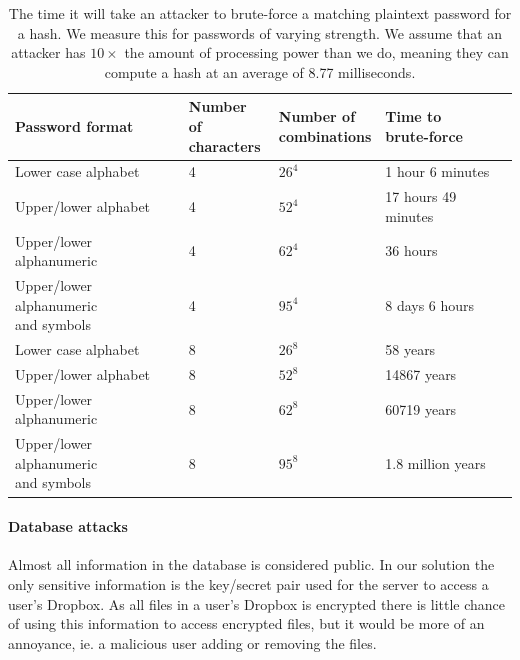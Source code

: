 \documentclass[12pt, titlepage]{article}
\begin{document}
\begin{center}
\begin{table}[h!]
    \begin{tabular}{ | l | l | l | l |}
    \hline
    \textbf{Password format} & \shortstack{\textbf{Number of} \\ \textbf{characters}} & \shortstack{\textbf{Number of} \\ \textbf{combinations}} & \shortstack{\textbf{Time to} \\ \textbf{brute-force}} \\ \hline
    Lower case alphabet  & 4 & $26^4$ & 1 hour 6 minutes \\ \hline
    Upper/lower alphabet  & 4 & $52^4$ & 17 hours 49 minutes \\ \hline
    Upper/lower alphanumeric & 4 & $62^4$ & 36 hours \\ \hline
    \shortstack{Upper/lower alphanumeric \\ and symbols}  & 4 & $95^4$ & 8 days 6 hours \\ \hline
    Lower case alphabet  & 8 & $26^8$ & 58 years \\ \hline
    Upper/lower alphabet  & 8 & $52^8$ & 14867 years \\ \hline
    Upper/lower alphanumeric & 8 & $62^8$ & 60719 years \\ \hline
    \shortstack{Upper/lower alphanumeric \\ and symbols}  & 8 & $95^8$ & 1.8 million years \\ \hline
    
    \end{tabular}
    \caption{The time it will take an attacker to brute-force a matching plaintext password for a hash. We measure this for passwords of varying strength. We assume that an attacker has $10 \times$ the amount of processing power than we do, meaning they can compute a hash at an average of 8.77 milliseconds.} \label{tab:passwordbruteforce}
    \end{table}
\end{center}

\paragraph*{Database attacks} Almost all information in the database is considered public. In our solution the only sensitive information is the key/secret pair used for the server to access a user's Dropbox. As all files in a user's Dropbox is encrypted there is little chance of using this information to access encrypted files, but it would be more of an annoyance, ie. a malicious user adding or removing the files.
\end{document}

